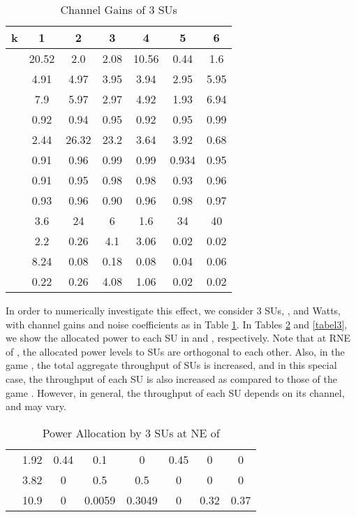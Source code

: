 \documentclass[peerreview,onecolumn,11pt,draftclsnofoot]{IEEEtran}\usepackage{amsmath}\usepackage{amsfonts}\usepackage{epsfig}\usepackage{amssymb}\usepackage{graphicx}\usepackage{amssymb,amsmath}\usepackage{cite}\usepackage{color,soul}\newcommand\T{\rule{0pt}{3.1ex}}
\begin{document}
\begin{table}[h]
\caption{Channel Gains of 3 SUs} \vspace{-.2in}\centering
\begin{tabular}{|c|c|c|c|c|c|c|}
  \hline
k & 1 & 2 & 3 & 4& 5 & 6 \\
  \hline
   & 20.52 &  2.0  &  2.08 &  10.56  &  0.44 &   1.6 \\
 &   4.91  &  4.97 &   3.95 &   3.94& 2.95& 5.95\\
 &  7.9  &  5.97 &   2.97  &  4.92  &  1.93 & 6.94\\
 & 0.92  & 0.94  &  0.95 &   0.92   & 0.95& 0.99\\
 & 2.44&  26.32&   23.2&    3.64&    3.92& 0.68 \\
 & 0.91  &  0.96   & 0.99   & 0.99  &  0.934 &0.95\\
 & 0.91 &  0.95&    0.98&    0.98   & 0.93& 0.96\\
 & 0.93&    0.96&    0.90&    0.96&    0.98&    0.97\\
&  3.6&   24&    6&    1.6&   34& 40\\
 &2.2&    0.26&    4.1&    3.06&    0.02& 0.02\\
 &    8.24&    0.08&    0.18&    0.08& 0.04&0.06\\
   &  0.22&    0.26&    4.08&    1.06&    0.02&
  0.02\\
  \hline
\end{tabular}
\label{tabel1}
\end{table}

In order to numerically investigate this effect, we consider 3 SUs, ,  and  Watts, with channel gains and noise coefficients as in Table \ref{tabel1}. In Tables \ref{tabel2} and \ref{tabel3}, we show the allocated power to each SU in  and , respectively. Note that at RNE of , the allocated power levels to SUs are orthogonal to each other. Also, in the game , the total aggregate throughput of SUs is increased, and in this special case, the throughput of each SU is also increased as compared to those of the game . However, in general, the throughput of each SU depends on its channel, and may vary.

\begin{table}[h]
\caption{Power Allocation by 3 SUs at NE of } \vspace{-.2in}\centering
\begin{tabular}{|c|c|c|c|c|c|c|c|}
\hline
  &  &  &  &  & &  & \\
  \hline
   &1.92&  0.44  &  0.1&     0 &   0.45 &  0  &       0  \\
& 3.82& 0   & 0.5&    0.5&     0  &       0 &        0 \\
 &  10.9 &0  &  0.0059    &0.3049  &   0  &  0.32 &   0.37 \\
\hline
\end{tabular}
\label{tabel2}
\end{table}
\end{document}
